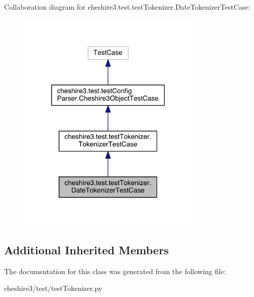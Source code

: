 Collaboration diagram for cheshire3.\-test.\-test\-Tokenizer.\-Date\-Tokenizer\-Test\-Case\-:
\nopagebreak
\begin{figure}[H]
\begin{center}
\leavevmode
\includegraphics[width=246pt]{classcheshire3_1_1test_1_1test_tokenizer_1_1_date_tokenizer_test_case__coll__graph}
\end{center}
\end{figure}
\subsection*{Additional Inherited Members}


The documentation for this class was generated from the following file\-:\begin{DoxyCompactItemize}
\item 
cheshire3/test/test\-Tokenizer.\-py\end{DoxyCompactItemize}
